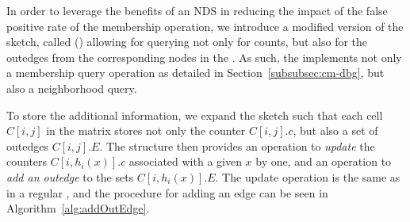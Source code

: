


In order to leverage the benefits of an NDS in reducing the impact of the false positive rate of the membership operation, we introduce a modified version of the \cm sketch, called \keyterm{\dB\cm} (\dBCM) allowing for querying not only for \kmer counts, but also for the outedges from the corresponding nodes in the \dBG. As such, the \dBCM implements not only a membership query operation as detailed in Section~\ref{subsubsec:cm-dbg}, but also a neighborhood query.


To store the additional information, we expand the \cm sketch such that each cell $C[i,j]$ in the matrix stores not only the counter $C[i,j].c$, but also a set of outedges $C[i,j].E$. The structure then provides an operation to \emph{update} the counters $C[i,h_i(x)].c$ associated with a given \kmer $x$ by one, and an operation to \emph{add an outedge} to the sets $C[i,h_i(x)].E$. The update operation is the same as in a regular \cm, and the procedure for adding an edge can be seen in Algorithm~\ref{alg:addOutEdge}.


